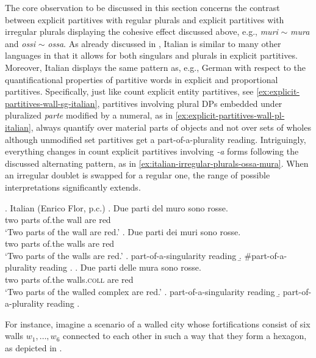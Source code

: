 The core observation to be discussed in this section concerns the contrast between explicit partitives with regular plurals and explicit partitives with irregular plurals displaying the cohesive effect discussed above, e.g., \textit{muri} $\sim$ \textit{mura} and \textit{ossi} $\sim$ \textit{ossa}. As already discussed in , Italian is similar to many other languages in that it allows for both singulars and plurals in explicit partitives. Moreover, Italian displays the same pattern as, e.g., German with respect to the quantificational properties of partitive words in explicit and proportional partitives. Specifically, just like count explicit entity partitives, see \ref{ex:explicit-partitives-wall-sg-italian}, partitives involving plural DPs embedded under pluralized \textit{parte} modified by a numeral, as in \ref{ex:explicit-partitives-wall-pl-italian}, always quantify over material parts of objects and not over sets of wholes although unmodified set partitives get a part-of-a-plurality reading. Intriguingly, everything changes in count explicit partitives involving \textit{-a} forms following the discussed alternating pattern, as in \ref{ex:italian-irregular-plurals-ossa-mura}. When an irregular doublet is swapped for a regular one, the range of possible interpretations significantly extends.\largerpage
		
\ex.\label{ex:explicit-partitives-wall-italian} Italian (Enrico Flor, p.c.)
\ag. Due   parti del    muro sono rosse.\label{ex:explicit-partitives-wall-sg-italian}\\
    two parts of.the wall are  red\\
    `Two parts of the wall are red.'
\bg. Due  parti dei    muri sono rosse.\label{ex:explicit-partitives-wall-pl-italian}\\
    two parts of.the walls are  red\\
    `Two parts of the walls are red.'
    \a. part-of-a-singularity reading
    \b. \#part-of-a-plurality reading
    \z.
\bg. Due   parti delle  mura sono rosse.\label{ex:explicit-partitives-wall-coll-italian}\\
    two parts of.the walls\textsc{.coll} are  red\\
    `Two parts of the walled complex are red.'
    \a. part-of-a-singularity reading
    \b. part-of-a-plurality reading
    \z.

For instance, imagine a scenario of a walled city whose fortifications consist of six walls $w_1,\dots,w_6$ connected to each other in such a way that they form a hexagon, as depicted in .   

